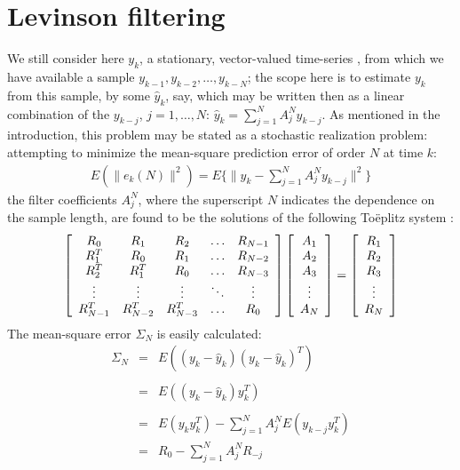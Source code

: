 \section{Levinson filtering}
\label{levin}
We still consider here $y_k$, a stationary, vector-valued time-series
, 
from which we have available a sample $y_{k-1}, y_{k-2}, 
\ldots , y_{k-N}$; the scope here is to estimate $y_k$ from this 
sample, by some $\hat{y}_k$, say, which may be written then 
as a linear combination of the $y_{k-j}$, $j=1, \ldots , N$: 
$\hat{y}_k=\sum_{j=1}^{N}A^N_j y_{k-j}$. 
As mentioned in the introduction, 
this problem may be stated as a stochastic realization problem: 
attempting to minimize the mean-square prediction error of order 
$N$ at time $k$:
\begin{eqnarray}
E(\| e_k(N) \| ^2)=E\{ \| y_k - \sum_{j=1}^NA^N_j y_{k-j}\|^2\}
\label{e.lev.1}
\end{eqnarray}
the filter coefficients $A^N_j$, where the superscript $N$
indicates the dependence on the sample length, 
are found to be the solutions of the 
following To\"{e}plitz system :
\begin{equation}
\left[ \begin{array}[c]{ccccc}
R_0 & R_1 & R_2 & \ldots & R_{N-1}\\
R_1^T & R_0 & R_1 & \ldots & R_{N-2}\\
R_2^T & R_1^T & R_0 & \ldots & R_{N-3}\\
\vdots & \vdots & \vdots & \ddots & \vdots \\
R_{N-1}^T & R_{N-2}^T & R_{N-3}^T & \ldots & R_0
\end{array} \right]
\left[ \begin{array}[c]{c}
A_1 \\A_2 \\A_3 \\ \vdots \\A_N \end{array} \right]
= \left[ \begin{array}[c]{c}
R_1 \\ R_2 \\ R_3 \\ \vdots \\R_N \end{array} \right]
\label{e.lev.2}
\end{equation}
The mean-square error $\Sigma_N$ is easily calculated:
\begin{eqnarray}
\Sigma_N&=&E((y_k-\hat{y}_k)(y_k-\hat{y}_k)^T) \nonumber \\ \\
&=&E((y_k-\hat{y}_k)y^T_k) \nonumber \\ \\
&=&E(y_ky^T_k)-\sum_{j=1}^N A^N_{j}E(y_{k-j}y^T_k) \nonumber \\
&=&R_0-\sum_{j=1}^N A^N_{j}R_{-j}
\label{e.lev.3}
\end{eqnarray}
